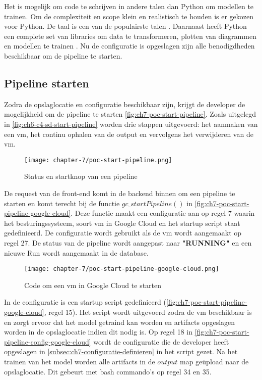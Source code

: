 Het is mogelijk om code te schrijven in andere talen dan Python om modellen te trainen. Om de complexiteit en scope klein en realistisch te houden is er gekozen voor Python. De taal is een van de populairste talen \cite{stack-overflow-survey-2020-loved-dreaded-framework-libraries-tools}. Daarnaast heeft Python een complete set van libraries om data te transformeren, plotten van diagrammen en modellen te trainen \cite{python-libraries}. Nu de configuratie is opgeslagen zijn alle benodigdheden beschikbaar om de pipeline te starten. 

\subsection{Pipeline starten}\label{subsec:ch7-pipeline-starten}
Zodra de opslaglocatie en configuratie beschikbaar zijn, krijgt de developer de mogelijkheid om de pipeline te starten \autoref{fig:ch7-poc-start-pipeline}. Zoals uitgelegd in \autoref{fig:ch6-c4-sd-start-pipeline} worden drie stappen uitgevoerd: het aanmaken van een \acrshort{vm}, het continu ophalen van de output en vervolgens het verwijderen van de \acrshort{vm}.

\begin{figure}[hbt!]
  \centering
  \texttt{[image: chapter-7/poc-start-pipeline.png]}
  \caption{Status en startknop van een pipeline}
  \label{fig:ch7-poc-start-pipeline}
\end{figure}

De request van de front-end komt in de backend binnen om een pipeline te starten en komt terecht bij de functie \(gc\_startPipeline()\) in \autoref{fig:ch7-poc-start-pipeline-google-cloud}. Deze functie maakt een configuratie aan op regel 7 waarin het besturingssysteem, soort \acrshort{vm} in Google Cloud en het startup script staat gedefinieerd. De configuratie wordt gebruikt als de \acrshort{vm} wordt aangemaakt op regel 27. De status van de pipeline wordt aangepast naar \textbf{"RUNNING"} en een nieuwe Run wordt aangemaakt in de database.

\begin{figure}[hbt!]
  \centering
  \texttt{[image: chapter-7/poc-start-pipeline-google-cloud.png]}
  \caption{Code om een \acrfull{vm} in Google Cloud te starten}
  \label{fig:ch7-poc-start-pipeline-google-cloud}
\end{figure}

\newpage

In de configuratie is een startup script gedefinieerd (\autoref{fig:ch7-poc-start-pipeline-google-cloud}, regel 15). Het script wordt uitgevoerd zodra de \acrshort{vm} beschikbaar is en zorgt ervoor dat het model getraind kan worden en \glspl{artifact} opgeslagen worden in de opslaglocatie indien dit nodig is. Op regel 18 in \autoref{fig:ch7-poc-start-pipeline-config-google-cloud} wordt de configuratie die de developer heeft opgeslagen in \autoref{subsec:ch7-configuratie-definieren} in het script gezet. Na het trainen van het model worden alle \glspl{artifact} in de \(output\) map geüpload naar de opslaglocatie. Dit gebeurt met bash commando's op regel 34 en 35.

